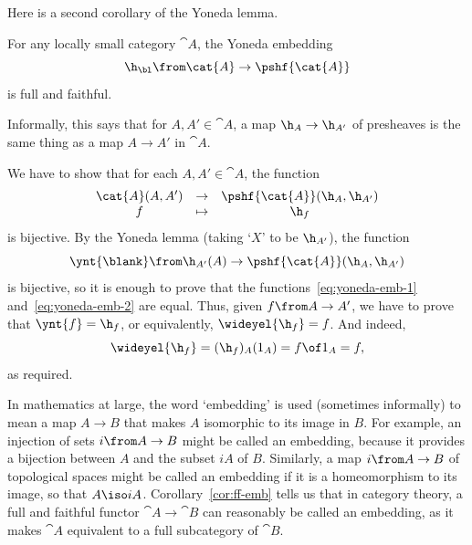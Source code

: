 %
%

Here is a second corollary of the Yoneda lemma.

\begin{cor}
\label{cor:yoneda-ff}
For any locally small category $\cat{A}$, the Yoneda embedding
\[
\h_\bl\from \cat{A} \to \pshf{\cat{A}}
\]
is full and faithful.
\end{cor}

Informally, this says that for $A, A' \in \cat{A}$, a map $\h_A \to \h_{A'}$ of
presheaves is the same thing as a map $A \to A'$ in $\cat{A}$.

\begin{pf}
We have to show that for each $A, A' \in \cat{A}$, the function
% 
\begin{equation}        
\label{eq:yoneda-emb-1}
\begin{array}{ccc}
\cat{A}(A, A')  &\to            &\pshf{\cat{A}}(\h_A, \h_{A'})    \\
f               &\mapsto        &\h_f
\end{array}
\end{equation}
% 
is bijective.  By the Yoneda lemma (taking `$X$' to be $\h_{A'}$), the function
% 
\begin{equation}        
\label{eq:yoneda-emb-2}
\ynt{\blank}\from
\h_{A'}(A) \to \pshf{\cat{A}}(\h_A, \h_{A'})
\end{equation}
% 
is bijective, so it is enough to prove that the
functions~\eqref{eq:yoneda-emb-1} and~\eqref{eq:yoneda-emb-2} are equal.
Thus, given $f\from A \to A'$, we have to prove that $\ynt{f} = \h_f$, or
equivalently, $\wideyel{\h_f} = f$.  And indeed,
\[
\wideyel{\h_f}
=
(\h_f)_A(1_A)
=
f \of 1_A 
=
f,
\]
as required.
\end{pf}

In mathematics at large, the word `embedding'%
%
%
is used (sometimes informally) to mean a map $A \to B$ that makes $A$
isomorphic to its image in $B$.  For example, an injection of sets $i\from
A \to B$ might be called an embedding, because it provides a bijection
between $A$ and the subset $iA$ of $B$.  Similarly, a map $i\from A \to B$
of topological spaces might be called an embedding if it is a homeomorphism
to its image, so that $A \iso iA$.  Corollary~\ref{cor:ff-emb} tells us
that in category theory, a full and faithful functor $\cat{A} \to \cat{B}$
can reasonably be called an embedding, as it makes $\cat{A}$ equivalent to
a full subcategory of $\cat{B}$.

